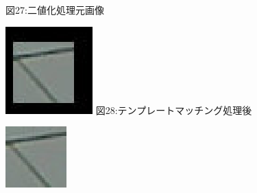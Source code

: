 ﻿\documentclass[a4j,11pt]{jarticle}
\begin{document}
\begin{figure}[tb]
\begin{minipage}{0.49\hsize}
  図27:二値化処理元画像
 \end{minipage}
 \label{fig:affine2}
 \begin{minipage}{0.49\hsize} %
   \center
   \includegraphics[width=\hsize]{./eps/template-04.eps}
   図28:テンプレートマッチング処理後
 \end{minipage}
 \begin{minipage}{0.49\hsize} %
   \center
   \includegraphics[width=\hsize]{./eps/template.eps}


\end{minipage}
\end{figure}
\end{document}
